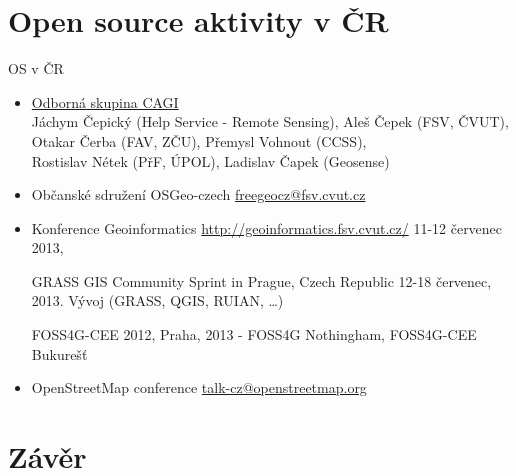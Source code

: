 \documentclass[xcolor=dvipsnames]{beamer}
\begin{document}
\section{Open source aktivity v ČR}
\begin{frame}{OS v ČR}
    \begin{itemize}
        \item \href{http://www.cagi.cz/os25-open-source-a-open-data}{Odborná skupina CAGI} \\
            Jáchym Čepický (Help Service - Remote Sensing), Aleš Čepek (FSV, ČVUT),\\
            Otakar Čerba (FAV, ZČU), Přemysl Vohnout (CCSS),\\
            Rostislav Nétek (PřF, ÚPOL), Ladislav Čapek (Geosense)
        \pause

        \item Občanské sdružení OSGeo-czech \href{mailto:freegeocz@fsv.cvut.cz}{freegeocz@fsv.cvut.cz}
            \pause
        \item Konference Geoinformatics \url{http://geoinformatics.fsv.cvut.cz/}
            11-12 červenec 2013, 
            
            GRASS GIS Community Sprint in Prague, Czech Republic 12-18
            červenec, 2013. Vývoj (GRASS, QGIS, RUIAN, \dots)
            \pause

            FOSS4G-CEE 2012, Praha, 2013 - FOSS4G Nothingham, FOSS4G-CEE Bukurešť

            \pause 
        \item OpenStreetMap conference \href{mailto:talk-cz@openstreetmap.org}{talk-cz@openstreetmap.org}
    \end{itemize}
\end{frame}



\section*{Závěr}
\end{document}
